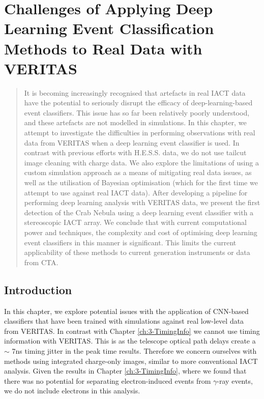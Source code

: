 \chapter{\label{ch:4-VERITASRealData} Challenges of Applying Deep Learning Event Classification Methods to Real Data with VERITAS}
\minitoc
\begin{abstract}
    It is becoming increasingly recognised that artefacts in real IACT data have the potential to seriously disrupt the efficacy of deep-learning-based event classifiers. This issue has so far been relatively poorly understood, and these artefacts are not modelled in simulations. In this chapter, we attempt to investigate the difficulties in performing observations with real data from VERITAS when a deep learning event classifier is used. In contrast with previous efforts with H.E.S.S. data, we do not use tailcut image cleaning with charge data. We also explore the limitations of using a custom simulation approach as a means of mitigating real data issues, as well as the utilisation of Bayesian optimisation (which for the first time we attempt to use against real IACT data). After developing a pipeline for performing deep learning analysis with VERITAS data, we present the first detection of the Crab Nebula using a deep learning event classifier with a stereoscopic IACT array. We conclude that with current computational power and techniques, the complexity and cost of optimising deep learning event classifiers in this manner is significant. This limits the current applicability of these methods to current generation instruments or data from CTA.
\end{abstract}

\section{Introduction}

In this chapter, we explore potential issues with the application of CNN-based classifiers that have been trained with simulations against real low-level data from VERITAS. In contrast with Chapter \ref{ch:3-TimingInfo} we cannot use timing information with VERITAS. This is as the telescope optical path delays create a $\sim$ 7ns timing jitter in the peak time results. Therefore we concern ourselves with methods using integrated charge-only images, similar to more conventional IACT analysis. Given the results in Chapter \ref{ch:3-TimingInfo}, where we found that there was no potential for separating electron-induced events from $\gamma$-ray events, we do not include electrons in this analysis. 


